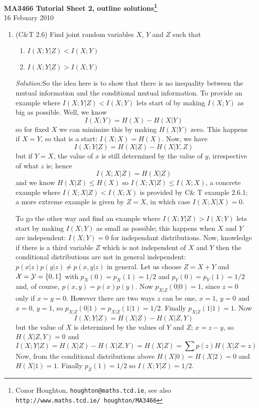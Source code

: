 \documentclass[12pt]{article}
\newcommand{\soln}{\noindent\textit{Solution:}}
\begin{document}
\begin{center}
{\bf MA3466 Tutorial Sheet 2, outline solutions\footnote{Conor Houghton, {\tt houghton@maths.tcd.ie}, see also {\tt http://www.maths.tcd.ie/ houghton/MA3466}}}\\[1cm]{} 16 Febuary 2010
\end{center}
\begin{enumerate}

\item (C\&T 2.6) Find joint random variables $X$, $Y$ and $Z$ such that 
\begin{enumerate}
\item $I(X;Y|Z)<I(X;Y)$
\item $I(X;Y|Z)>I(X;Y)$
\end{enumerate}

\soln So the idea here is to show that there is no inequality between
the mutual information and the conditional mutual information. To provide an example where $I(X;Y|Z)<I(X;Y)$ lets start of by making $I(X;Y)$ as big as possible. Well, we know
\begin{equation}
I(X;Y)=H(X)-H(X|Y)
\end{equation}
so for fixed $X$ we can minimize this by making $H(X|Y)$ zero. This happens if $X=Y$, so that is a start: $I(X;X)=H(X)$. Now, we have
\begin{equation}
I(X;Y|Z)=H(X|Z)-H(X|Y,Z)
\end{equation}
but if $Y=X$, the value of $x$ is still determined by the value of $y$, irrespective of what $z$ is; hence
\begin{equation}
I(X;X|Z)=H(X|Z)
\end{equation}
and we know $H(X|Z)\le H(X)$ so $I(X;X|Z)\le I(X;X)$, a concrete example where $I(X;X|Z)<I(X;X)$ is provided by C\& T example 2.6.1; a more extreme example is given by $Z=X$, in which case $I(X;X|X)=0$.

To go the other way and find an example where $I(X;Y|Z)>I(X;Y)$ lets
start by making $I(X;Y)$ as small as possible; this happens when $X$
and $Y$ are independent: $I(X;Y)=0$ for independant
distributions. Now, knowledge if there is a third variable $Z$ which
is not independent of $X$ and $Y$ then the conditional distributions
are not in general independent: $p(x|z)p(y|z)\not=p(x,y|z)$ in
general. Let us choose $Z=X+Y$ and ${\cal X}={\cal Y}=\{0,1\}$ with $p_X(0)=p_X(1)=1/2$ and $p_Y(0)=p_Y(1)=1/2$ and, of course, $p(x,y)=p(x)p(y)$. Now $p_{X|Z}(0|0)=1$, since $z=0$ only if $x=y=0$. However there are two ways $z$ can be one, $x=1$, $y=0$ and $x=0$, $y=1$, so $p_{X|Z}(0|1)=p_{X|Z}(1|1)=1/2$. Finally $p_{X|Z}(1|1)=1$. Now
\begin{equation}
I(X;Y|Z)=H(X|Z)-H(X|Z,Y)
\end{equation}
but the value of $X$ is determined by the values of $Y$ and $Z$; $x=z-y$, so $H(X|Z,Y)=0$ and
\begin{equation}
I(X;Y|Z)=H(X|Z)-H(X|Z,Y)=H(X|Z)=\sum p(z)H(X|Z=z)
\end{equation}
Now, from the conditional distributions above $H(X|0)=H(X|2)=0$ and $H(X|1)=1$. Finally $p_Z(1)=1/2$ so $I(X;Y|Z)=1/2$.


\end{enumerate}
\end{document}
